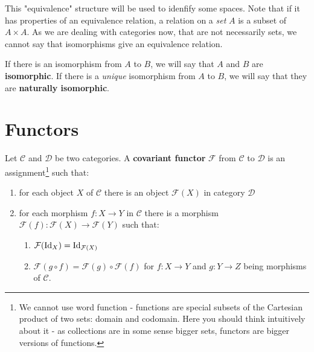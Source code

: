 This "equivalence" structure will be used to idenfify some spaces. Note that if it has properties of an equivalence relation, a relation on a \emph{set} $A$ is a subset of $A\times A$. As we are
dealing with categories now, that are not necessarily sets, we cannot say that isomorphisms give an equivalence relation.

\begin{definition}
  If there is an isomorphism from $A$ to $B$, we will say that $A$ and $B$ are \textbf{isomorphic}. If there is a \emph{unique} isomorphism from $A$ to $B$, we will say that they are \textbf{naturally isomorphic}.
\end{definition}

\section{Functors}

\begin{definition}
    Let $\mathcal C$ and $\mathcal D$ be two categories. A \textbf{covariant functor} $\mathcal F$ from $\mathcal C$ to $\mathcal D$ is an assignment\footnote{We cannot use word function - functions are special subsets of the Cartesian product of two sets: domain and codomain. Here you should think intuitively about it - as collections are in some sense bigger sets, functors are bigger versions of functions.} such that:
    \begin{enumerate}
      \item for each object $X$ of $\mathcal C$ there is an object $\mathcal F(X)$ in category $\mathcal D$
      \item for each morphism $f: X\to Y$ in $\mathcal C$ there is a morphism $\mathcal F(f):\mathcal F(X)\to \mathcal F(Y)$ such that:
        \begin{enumerate}
          \item $\mathcal F(\text{Id}_X)=\text{Id}_{\mathcal F(X)}$
          \item $\mathcal F(g\circ f) = \mathcal F(g)\circ \mathcal F(f)$ for $f:X\to Y$ and $g:Y\to Z$ being morphisms of $\mathcal C$.
        \end{enumerate}
    \end{enumerate}
\end{definition}
